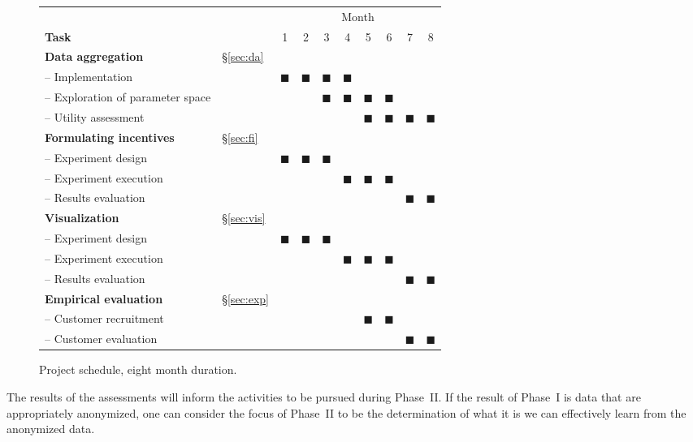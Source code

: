 \begin{figure}[ht]
\centering
\setlength\tabcolsep{2pt}
\begin{tabular}{l l | c c c c c c c c}
\  & & \multicolumn{8}{c}{Month}\\
\textbf{Task} & & 1 &  2 & 3 & 4 & 5 & 6 & 7 & 8 \\ \hline
\textbf{Data aggregation} & \S\ref{sec:da} & & & & & & & & \\
-- {\small Implementation} &  & $\blacksquare$ & $\blacksquare$ & $\blacksquare$ & $\blacksquare$ & & & &  \\
-- {\small Exploration of parameter space} &  & & & $\blacksquare$ & $\blacksquare$ & $\blacksquare$ & $\blacksquare$ & &  \\
-- {\small Utility assessment} & & & & & & $\blacksquare$ & $\blacksquare$ & $\blacksquare$ & $\blacksquare$  \\ \hline
\textbf{Formulating incentives} & \S\ref{sec:fi} & & & & & & &  \\
-- {\small Experiment design} & & $\blacksquare$ & $\blacksquare$ & $\blacksquare$ & & & &  \\
-- {\small Experiment execution} & & & & & $\blacksquare$ & $\blacksquare$ & $\blacksquare$ & &  \\
-- {\small Results evaluation} & & & & & & & & $\blacksquare$ & $\blacksquare$  \\ \hline
\textbf{Visualization} & \S\ref{sec:vis} & & & & & & &  \\
-- {\small Experiment design} & & $\blacksquare$ & $\blacksquare$ & $\blacksquare$ & & & &  \\
-- {\small Experiment execution} & & & & & $\blacksquare$ & $\blacksquare$ & $\blacksquare$ & &  \\
-- {\small Results evaluation} & & & & & & & & $\blacksquare$ & $\blacksquare$  \\ \hline
\textbf{Empirical evaluation} & \S\ref{sec:exp} & & & & & & & & \\
-- {\small Customer recruitment} & & & & & & $\blacksquare$ & $\blacksquare$ & & \\ 
-- {\small Customer evaluation} & & & & & & & & $\blacksquare$ & $\blacksquare$ \\
\end{tabular}
    \caption{Project schedule, eight month duration.}
    \label{fig:gantt}
\end{figure}

The results of the assessments will inform
the activities to be pursued during Phase~II.
If the result of Phase~I is data that are appropriately anonymized,
one can consider the focus of Phase~II to be the determination of
what it is we can effectively learn from the anonymized data.

